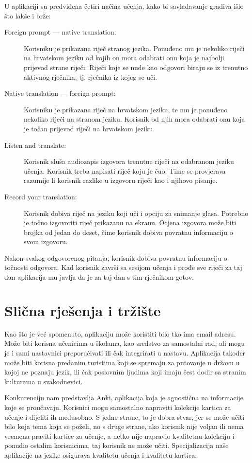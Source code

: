 U aplikaciji su predviđena četiri načina učenja, kako bi savladavanje gradiva išlo što lakše i brže:
\begin{description}
	\item[Foreign prompt --- native translation:] Korisniku je prikazana riječ stranog jezika. Ponuđeno mu je nekoliko riječi na hrvatskom jeziku od kojih on mora odabrati onu koja je najbolji prijevod strane riječi. Riječi koje se nude kao odgovori biraju se iz trenutno aktivnog rječnika, tj. rječnika iz kojeg se uči. 
	\item[Native translation --- foreign prompt:] Korisniku je prikazana riječ na hrvatskom jeziku, te mu je ponuđeno nekoliko riječi na stranom jeziku. Korisnik od njih mora odabrati onu koja je točan prijevod riječi na hrvatskom jeziku.
	\item[Listen and translate:] Korisnik sluša audiozapis izgovora trenutne riječi na odabranom jeziku učenja. Korisnik treba napisati riječ koju je čuo. Time se provjerava razumije li korisnik razlike u izgovoru riječi kao i njihovo pisanje.
	\item[Record your translation:] Korisnik dobiva riječ na jeziku koji uči i opciju za snimanje glasa. Potrebno je točno izgovoriti riječ prikazanu na ekranu. Ocjena izgovora može biti brojka od jedan do deset, čime korisnik dobiva povratnu informaciju o svom izgovoru.
\end{description}

Nakon svakog odgovorenog pitanja, korisnik dobiva povratnu informaciju o točnosti odgovora. Kad korisnik završi sa sesijom učenja i prođe sve riječi za taj dan aplikacija mu javlja da je za taj dan s tim rječnikom gotov. 

\eject

\section{Slična rješenja i tržište}

Kao što je već spomenuto, aplikaciju može koristiti bilo tko ima email adresu. Može biti korisna učenicima u školama, kao sredstvo za samostalni rad, ali mogu je i sami nastavnici preporučivati ili čak integrirati u nastavu. Aplikacija također može biti korisna predanim turistima koji se spremaju za putovanje u državu u kojoj ne poznaju jezik, ili čak poslovnim ljudima koji imaju čest dodir sa stranim kulturama u svakodnevici. 

Konkurenciju nam predstavlja Anki, aplikacija koja je agnostična na informacije koje se proučavaju. Korisnici mogu samostalno napraviti kolekcije kartica za učenje i dijeliti ih međusobno. S jedne strane, to je dobra stvar, jer se može učiti bilo koja tema koja se poželi, no s druge strane, ako korisnik nije voljan ili nema vremena praviti kartice za učenje, a netko nije napravio kvalitetnu kolekciju i ponudio ostalim korisnicima, taj korisnik ne može učiti. Specijalizacija naše aplikacije na jezike osigurava kvalitetu učenja i kvalitetu kartica.

